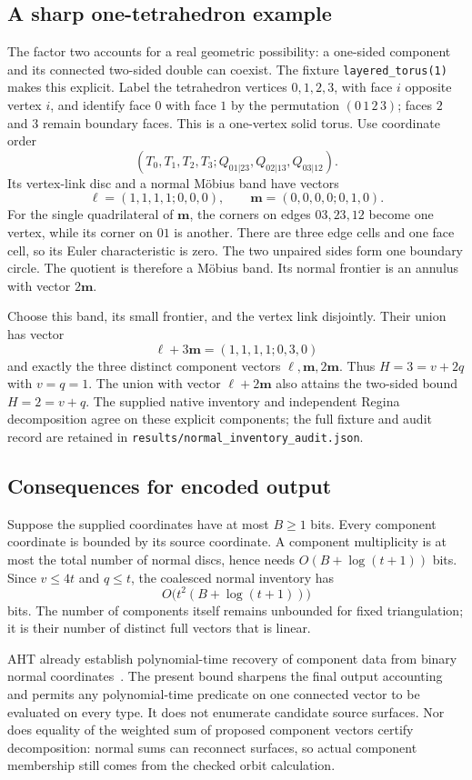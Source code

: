\subsection{A sharp one-tetrahedron example}

The factor two accounts for a real geometric possibility: a one-sided
component and its connected two-sided double can coexist. The fixture
\texttt{layered\_torus(1)} makes this explicit. Label the tetrahedron
vertices $0,1,2,3$, with face $i$ opposite vertex $i$, and identify face
$0$ with face $1$ by the permutation
$(0\,1\,2\,3)$; faces $2$ and $3$ remain boundary faces. This is a
one-vertex solid torus. Use coordinate order
\[
 (T_0,T_1,T_2,T_3;Q_{01|23},Q_{02|13},Q_{03|12}).
\]
Its vertex-link disc and a normal M\"obius band have vectors
\[
 \boldsymbol\ell=(1,1,1,1;0,0,0),\qquad
 \mathbf m=(0,0,0,0;0,1,0).
\]
For the single quadrilateral of $\mathbf m$, the corners on edges
$03,23,12$ become one vertex, while its corner on $01$ is another.
There are three edge cells and one face cell, so its Euler characteristic
is zero. The two unpaired sides form one boundary circle. The quotient
is therefore a M\"obius band. Its normal frontier is an annulus with
vector $2\mathbf m$.

Choose this band, its small frontier, and the vertex link disjointly.
Their union has vector
\[
 \boldsymbol\ell+3\mathbf m=(1,1,1,1;0,3,0)
\]
and exactly the three distinct component vectors
$\boldsymbol\ell,\mathbf m,2\mathbf m$. Thus $H=3=v+2q$ with $v=q=1$.
The union with vector $\boldsymbol\ell+2\mathbf m$ also attains the
two-sided bound $H=2=v+q$. The supplied native inventory and independent
Regina decomposition agree on these explicit components; the full fixture
and audit record are retained in
\texttt{results/normal\_inventory\_audit.json}.

\subsection{Consequences for encoded output}

Suppose the supplied coordinates have at most $B\ge1$ bits. Every
component coordinate is bounded by its source coordinate. A component
multiplicity is at most the total number of normal discs, hence needs
$O(B+\log(t+1))$ bits. Since $v\le4t$ and $q\le t$, the coalesced
normal inventory has
\[
             O\bigl(t^2(B+\log(t+1))\bigr)
\]
bits. The number of components itself remains unbounded for fixed
triangulation; it is their number of distinct full vectors that is linear.

AHT already establish polynomial-time recovery of component data from
binary normal coordinates~\cite[Corollary 17]{aht2006}. The present bound
sharpens the final output accounting and permits any polynomial-time
predicate on one connected vector to be evaluated on every type.
It does not enumerate candidate source surfaces. Nor does equality of
the weighted sum of proposed component vectors certify decomposition:
normal sums can reconnect surfaces, so actual component membership still
comes from the checked orbit calculation.
